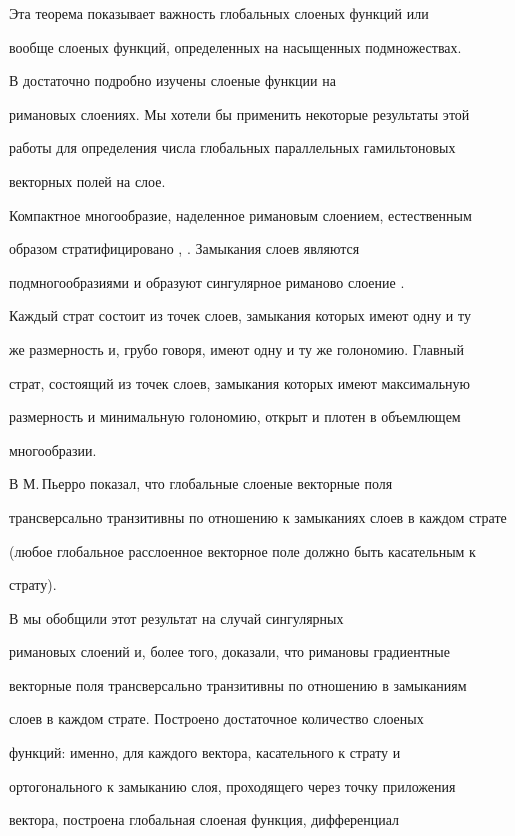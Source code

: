Эта теорема показывает важность глобальных слоеных функций или


вообще слоеных функций, определенных на насыщенных подмножествах.


В \cite{WO12} достаточно подробно изучены слоеные функции на


римановых слоениях. Мы хотели бы применить некоторые результаты этой


работы для определения числа глобальных параллельных гамильтоновых


векторных полей на слое.





Компактное многообразие, наделенное римановым слоением, естественным


образом стратифицировано \cite{PI}, \cite{MO}. Замыкания слоев являются


подмногообразиями и образуют сингулярное риманово слоение \cite{MO}.


Каждый страт состоит из точек слоев, замыкания которых имеют одну и ту


же размерность и, грубо говоря, имеют одну и ту же голономию. Главный


страт, состоящий из точек слоев, замыкания которых имеют максимальную


размерность и минимальную голономию, открыт и плотен в объемлющем


многообразии.


В \cite{PI} М.\,Пьерро показал, что глобальные слоеные векторные поля


трансверсально транзитивны по отношению к замыканиях слоев в каждом страте


(любое глобальное расслоенное векторное поле должно быть касательным к


страту).


В \cite{WO12} мы обобщили этот результат на случай сингулярных


римановых слоений и, более того, доказали, что римановы градиентные


векторные поля трансверсально транзитивны по отношению в замыканиям


слоев в каждом страте. Построено достаточное количество слоеных


функций: именно, для каждого вектора, касательного к страту и


ортогонального к замыканию слоя, проходящего через точку приложения


вектора, построена глобальная слоеная функция, дифференциал


